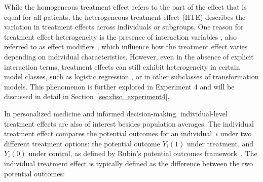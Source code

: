 




While the homogeneous treatment effect refers to the part of the effect that is equal for all patients, the heterogeneous treatment effect (HTE) describes the variation in treatment effects across individuals or subgroups. One reason for treatment effect heterogeneity is the presence of interaction variables \citep{hoogland2021}, also referred to as effect modifiers \citep{christensen2021}, which influence how the treatment effect varies depending on individual characteristics. However, even in the absence of explicit interaction terms, treatment effects can still exhibit heterogeneity in certain model classes, such as logistic regression \citep{hoogland2021}, or in other subclasses of transformation models. This phenomenon is further explored in Experiment 4 and will be discussed in detail in Section~\ref{sec:disc_experiment4}.

In personalized medicine and informed decision-making, individual-level treatment effects are also of interest besides population averages. The individual treatment effect compares the potential outcomes for an individual~$i$ under two different treatment options: the potential outcome $Y_i(1)$ under treatment, and $Y_i(0)$ under control, as defined by Rubin's potential outcomes framework~\citep{rubin2005}. The individual treatment effect is typically defined as the difference between the two potential outcomes:


